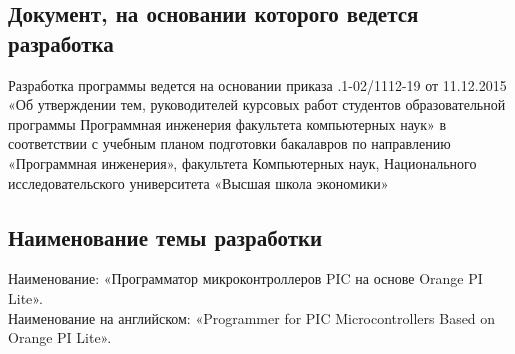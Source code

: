 \subsection{Документ, на основании которого ведется разработка}
Разработка программы ведется на основании приказа 
.1-02/1112-19 от 11.12.2015 
«Об  утверждении  тем,  руководителей  курсовых  работ  студентов
образовательной  программы  Программная  инженерия 
факультета 
компьютерных наук» в соответствии с учебным планом подготовки бакалавров по направлению «Программная инженерия», факультета Компьютерных наук,
Национального исследовательского университета «Высшая школа экономики» 


\subsection{Наименование темы разработки}
Наименование: «Программатор микроконтроллеров PIC на основе Orange PI Lite». \\
Наименование на английском: «Programmer for PIC Microcontrollers Based on Orange PI Lite». \\
